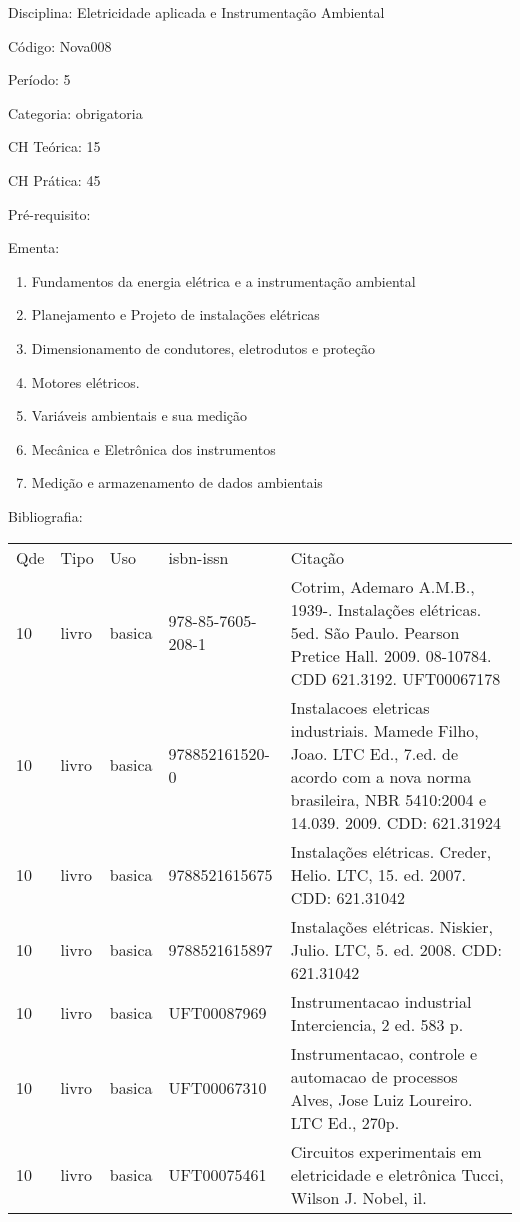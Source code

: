 \documentclass[12pt,a4paper,twoside]{report}
\begin{document}
Disciplina: Eletricidade aplicada e Instrumentação Ambiental

Código: Nova008

Período: 5

Categoria: obrigatoria

CH Teórica: 15

CH Prática: 45




Pré-requisito:
\begin{enumerate}
\end{enumerate}

Ementa:
\begin{enumerate}
\item Fundamentos da energia elétrica e a instrumentação ambiental
\item Planejamento e Projeto de instalações elétricas
\item Dimensionamento de condutores, eletrodutos e proteção
\item Motores elétricos.
\item Variáveis ambientais e sua medição
\item Mecânica e Eletrônica dos instrumentos
\item Medição e armazenamento de dados ambientais
\end{enumerate}



Bibliografia:


\begin{tabular}{llllp{8cm}}
Qde & Tipo & Uso & isbn-issn & Citação \\
10&livro&basica&978-85-7605-208-1&Cotrim, Ademaro A.M.B., 1939-. Instalações elétricas. 5ed. São Paulo. Pearson Pretice Hall. 2009. 08-10784. CDD 621.3192.  UFT00067178\\
10&livro&basica&978852161520-0&Instalacoes eletricas industriais. Mamede Filho, Joao. LTC Ed., 7.ed. de acordo com a nova norma brasileira, NBR 5410:2004 e 14.039. 2009. CDD: 621.31924\\
10&livro&basica&9788521615675&Instalações elétricas. Creder, Helio.  LTC,  15. ed. 2007. CDD: 621.31042\\
10&livro&basica&9788521615897&Instalações elétricas. Niskier, Julio.  LTC, 5. ed. 2008. CDD: 621.31042\\
10&livro&basica&UFT00087969&Instrumentacao industrial Interciencia, 2 ed. 583 p.\\
10&livro&basica&UFT00067310&Instrumentacao, controle e automacao de processos Alves, Jose Luiz Loureiro. LTC Ed., 270p.\\
10&livro&basica&UFT00075461&Circuitos experimentais em eletricidade e eletrônica Tucci, Wilson J. Nobel, il.\\
\end{tabular}
\end{document}
